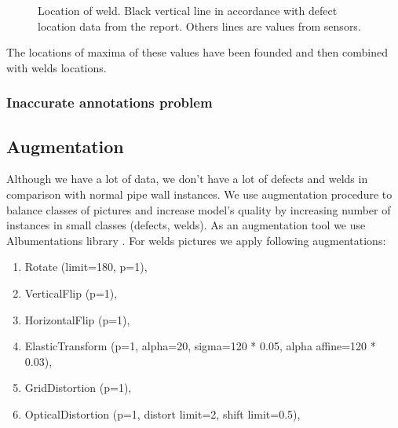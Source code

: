 \begin{figure}[!h]
	\caption{Location of weld. Black vertical line in accordance with defect location data from the report. Others lines are values from sensors.}
	\label{ris:prepr}
\end{figure}
The locations of maxima of these values have been founded and then combined with welds locations.


\subsubsection{Inaccurate annotations problem}


\subsection{Augmentation}
Although we have a lot of data, we don't have a lot of defects and welds in comparison with normal pipe wall instances.
We use augmentation procedure to balance classes of pictures and increase model's quality by increasing number of instances in small classes (defects, welds).
As an augmentation tool we use Albumentations library \cite{buslaev2020albumentations}.
For welds pictures we apply following augmentations:
\begin{enumerate}
	\item Rotate (limit=180, p=1),
	\item VerticalFlip (p=1), 
	\item HorizontalFlip (p=1), 
	\item ElasticTransform (p=1, alpha=20, sigma=120 * 0.05, alpha affine=120 * 0.03), 
	\item GridDistortion (p=1),
	\item OpticalDistortion (p=1, distort limit=2, shift limit=0.5),
\end{enumerate}

